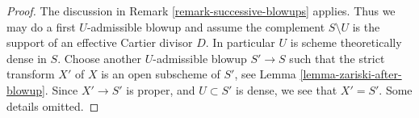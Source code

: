 \begin{proof}
The discussion in Remark \ref{remark-successive-blowups} applies.
Thus we may do a first $U$-admissible blowup and assume the complement
$S \setminus U$ is the support of an effective Cartier divisor $D$.
In particular $U$ is scheme theoretically dense in $S$.
Choose another $U$-admissible blowup $S' \to S$ such that the strict
transform $X'$ of $X$ is an open subscheme of $S'$, see
Lemma \ref{lemma-zariski-after-blowup}.
Since $X' \to S'$ is proper, and
$U \subset S'$ is dense, we see that $X' = S'$. Some details omitted.
\end{proof}























